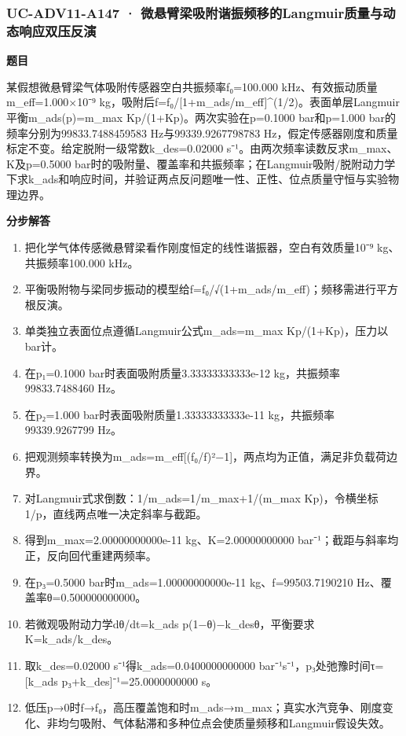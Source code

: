 \documentclass[UTF8,11pt,a4paper]{ctexart}
\begin{document}
\subsubsection*{UC-ADV11-A147 · 微悬臂梁吸附谐振频移的Langmuir质量与动态响应双压反演}
\noindent\textbf{题目}\par
某假想微悬臂梁气体吸附传感器空白共振频率f₀=100.000 kHz、有效振动质量m\_eff=1.000×10⁻⁹ kg，吸附后f=f₀/[1+m\_ads/m\_eff]\textasciicircum{}(1/2)。表面单层Langmuir平衡m\_ads(p)=m\_max Kp/(1+Kp)。两次实验在p=0.1000 bar和p=1.000 bar的频率分别为99833.7488459583 Hz与99339.9267798783 Hz，假定传感器刚度和质量标定不变。给定脱附一级常数k\_des=0.02000 s⁻¹。由两次频率读数反求m\_max、K及p=0.5000 bar时的吸附量、覆盖率和共振频率；在Langmuir吸附/脱附动力学下求k\_ads和响应时间，并验证两点反问题唯一性、正性、位点质量守恒与实验物理边界。\par
\medskip\noindent\textbf{分步解答}
\begin{enumerate}
\item 把化学气体传感微悬臂梁看作刚度恒定的线性谐振器，空白有效质量10⁻⁹ kg、共振频率100.000 kHz。
\item 平衡吸附物与梁同步振动的模型给f=f₀/√(1+m\_ads/m\_eff)；频移需进行平方根反演。
\item 单类独立表面位点遵循Langmuir公式m\_ads=m\_max Kp/(1+Kp)，压力以bar计。
\item 在p₁=0.1000 bar时表面吸附质量3.33333333333e-12 kg，共振频率99833.7488460 Hz。
\item 在p₂=1.000 bar时表面吸附质量1.33333333333e-11 kg，共振频率99339.9267799 Hz。
\item 把观测频率转换为m\_ads=m\_eff[(f₀/f)²−1]，两点均为正值，满足非负载荷边界。
\item 对Langmuir式求倒数：1/m\_ads=1/m\_max+1/(m\_max Kp)，令横坐标1/p，直线两点唯一决定斜率与截距。
\item 得到m\_max=2.00000000000e-11 kg、K=2.00000000000 bar⁻¹；截距与斜率均正，反向回代重建两频率。
\item 在p₃=0.5000 bar时m\_ads=1.00000000000e-11 kg、f=99503.7190210 Hz、覆盖率θ=0.500000000000。
\item 若微观吸附动力学dθ/dt=k\_ads p(1−θ)−k\_desθ，平衡要求K=k\_ads/k\_des。
\item 取k\_des=0.02000 s⁻¹得k\_ads=0.0400000000000 bar⁻¹s⁻¹，p₃处弛豫时间τ=[k\_ads p₃+k\_des]⁻¹=25.0000000000 s。
\item 低压p→0时f→f₀，高压覆盖饱和时m\_ads→m\_max；真实水汽竞争、刚度变化、非均匀吸附、气体黏滞和多种位点会使质量频移和Langmuir假设失效。
\end{enumerate}
\end{document}
